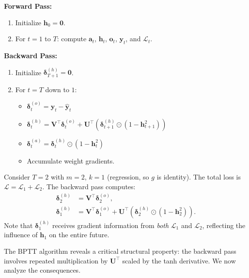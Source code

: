 \documentclass[11pt,a4paper]{article}
\begin{document}
\begin{keyresult}[title={Complete BPTT Algorithm}]
\textbf{Forward Pass:}
\begin{enumerate}[nosep]
  \item Initialize $\mathbf{h}_0 = \mathbf{0}$.
  \item For $t = 1$ to $T$: compute $\mathbf{a}_t$,
    $\mathbf{h}_t$, $\mathbf{o}_t$, $\mathbf{y}_t$, and
    $\mathcal{L}_t$.
\end{enumerate}
\textbf{Backward Pass:}
\begin{enumerate}[nosep]
  \item Initialize $\boldsymbol{\delta}_{T+1}^{(h)} = \mathbf{0}$.
  \item For $t = T$ down to $1$:
    \begin{itemize}[nosep]
      \item $\boldsymbol{\delta}_t^{(o)} = \mathbf{y}_t -
        \hat{\mathbf{y}}_t$
      \item $\boldsymbol{\delta}_t^{(h)} = \mathbf{V}^\top
        \boldsymbol{\delta}_t^{(o)} + \mathbf{U}^\top
        (\boldsymbol{\delta}_{t+1}^{(h)} \odot
        (1 - \mathbf{h}_{t+1}^2))$
      \item $\boldsymbol{\delta}_t^{(a)} =
        \boldsymbol{\delta}_t^{(h)} \odot (1 - \mathbf{h}_t^2)$
      \item Accumulate weight gradients.
    \end{itemize}
\end{enumerate}
\end{keyresult}

\begin{example}
\label{ex:bptt-two-step}
Consider $T = 2$ with $m = 2$, $k = 1$ (regression, so $g$ is
identity).  The total loss is $\mathcal{L} = \mathcal{L}_1 +
\mathcal{L}_2$.  The backward pass computes:
\begin{align*}
  \boldsymbol{\delta}_2^{(h)} &= \mathbf{V}^\top
    \boldsymbol{\delta}_2^{(o)}, \\
  \boldsymbol{\delta}_1^{(h)} &= \mathbf{V}^\top
    \boldsymbol{\delta}_1^{(o)} + \mathbf{U}^\top
    (\boldsymbol{\delta}_2^{(h)} \odot (1 - \mathbf{h}_2^2)).
\end{align*}
Note that $\boldsymbol{\delta}_1^{(h)}$ receives gradient information
from \emph{both} $\mathcal{L}_1$ and $\mathcal{L}_2$, reflecting
the influence of $\mathbf{h}_1$ on the entire future.
\end{example}

The BPTT algorithm reveals a critical structural property: the
backward pass involves repeated multiplication by $\mathbf{U}^\top$
scaled by the tanh derivative.  We now analyze the consequences.
\end{document}
